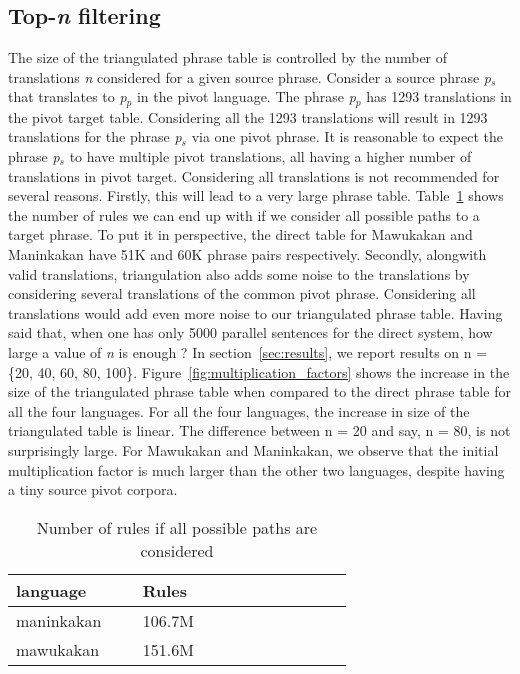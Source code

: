 \subsection{Top-\emph{n} filtering}
\label{subsec:topn}
 The size of the triangulated phrase table is controlled by the number of translations \emph{n} considered for a given source phrase. Consider a source phrase \emph{p$_s$} that translates to \emph{p$_p$} in the pivot language. The phrase \emph{p$_p$} has 1293 translations in the pivot target table. Considering all the 1293 translations will result in 1293 translations for the phrase \emph{p$_s$} via one pivot phrase. It is reasonable to expect the phrase \emph{p$_s$} to have multiple pivot translations, all having a higher number of translations in pivot target. Considering all translations is not recommended for several reasons. Firstly, this will lead to a very large phrase table. Table~\ref{table:allrules} shows the number of rules we can end up with if we consider all possible paths to a target phrase. To put it in perspective, the direct table for Mawukakan and Maninkakan have 51K and 60K phrase pairs respectively. Secondly, alongwith valid translations, triangulation also adds some noise to the translations by considering several translations of the common pivot phrase. Considering all translations would add even more noise to our triangulated phrase table. Having said that, when one has only 5000 parallel sentences for the direct system, how large a value of \emph{n} is enough ? In section~\ref{sec:results}, we report results on n = \{20, 40, 60, 80, 100\}. Figure~\ref{fig:multiplication_factors} shows the increase in the size of the triangulated phrase table when compared to the direct phrase table for all the four languages. For all the four languages, the increase in size of the triangulated table is linear. The difference between n = 20 and say, n = 80, is not surprisingly large. For Mawukakan and Maninkakan, we observe that the initial multiplication factor is much larger than the other two languages, despite having a tiny source pivot corpora.

        \begin{table}
                \footnotesize
                \small
                \centering

                \begin{tabular}{p{0.3\linewidth}p{0.5\linewidth}}
                \toprule
                language &  Rules \\
                \toprule
                maninkakan & 106.7M \\
                mawukakan & 151.6M \\
                \bottomrule
                \end{tabular}
                \caption{Number of rules if all possible paths are considered}
                \label{table:allrules}
        \end{table}


